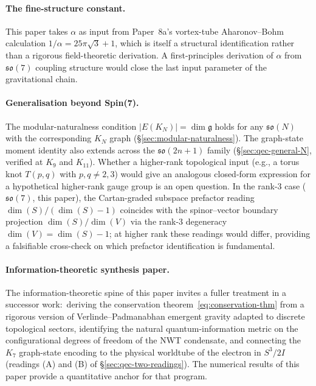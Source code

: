 \documentclass[11pt]{article}
\newcommand{\so}{\mathfrak{so}}
\begin{document}
\paragraph{The fine-structure constant.}
This paper takes $\alpha$ as input from Paper~8a's vortex-tube
Aharonov--Bohm calculation $1/\alpha = 25\pi\sqrt{3} + 1$, which
is itself a structural identification rather than a rigorous
field-theoretic derivation.  A first-principles derivation of
$\alpha$ from $\so(7)$ coupling structure would close the last
input parameter of the gravitational chain.

\paragraph{Generalisation beyond Spin(7).}
The modular-naturalness condition $|E(K_N)| = \dim \mathfrak{g}$
holds for any $\so(N)$ with the corresponding $K_N$ graph
(\S\ref{sec:modular-naturalness}).  The graph-state moment
identity also extends across the $\so(2n+1)$ family
(\S\ref{sec:qec-general-N}, verified at $K_9$ and $K_{11}$).
Whether a higher-rank topological input (e.g., a torus knot
$T(p,q)$ with $p,q \neq 2,3$) would give an analogous closed-form
expression for a hypothetical higher-rank gauge group is an open
question.  In the rank-3 case ($\so(7)$, this paper), the
Cartan-graded subspace prefactor reading
$\dim(S)/(\dim(S)-1)$ coincides with the spinor--vector boundary
projection $\dim(S)/\dim(V)$ via the rank-3 degeneracy
$\dim(V) = \dim(S) - 1$; at higher rank these readings would
differ, providing a falsifiable cross-check on which prefactor
identification is fundamental.

\paragraph{Information-theoretic synthesis paper.}
The information-theoretic spine of this paper invites a fuller
treatment in a successor work:\ deriving the conservation
theorem~\eqref{eq:conservation-thm} from a rigorous version of
Verlinde--Padmanabhan emergent gravity adapted to discrete
topological sectors, identifying the natural quantum-information
metric on the configurational degrees of freedom of the NWT
condensate, and connecting the $K_7$ graph-state encoding to the
physical worldtube of the electron in $S^3/2I$ (readings (A) and
(B) of \S\ref{sec:qec-two-readings}).  The numerical results of
this paper provide a quantitative anchor for that program.

\end{document}
